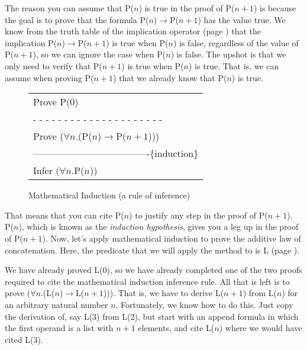 The reason you can assume that P($n$) is true in the proof of P($n+1$)
is because the goal is to prove that the formula
P($n$)$\rightarrow$P($n+1$) has the value true.
We know from the truth table of the implication operator
(page \pageref{implication-truth-table}) that the implication
P($n$)$\rightarrow$P($n+1$) is true when P($n$) is false,
regardless of the value of P($n+1$), so we can ignore the case when P($n$) is false.
The upshot is that we only need to verify that P($n+1$) is true when P($n$) is true.
That is, we can assume when proving P($n+1$) that we already know that P($n$) is true.
\begin{figure}
\begin{center}
\begin{tabular}{l}
Prove P(0) \\
 - - - - - - - - - - - - - - - - - - - - -\\
Prove ($\forall$$n$.(P($n$)$\rightarrow$P($n+1$))) \\
-------------------------------------\{induction\}\\
Infer ($\forall$$n$.P($n$))
\end{tabular}
\end{center}
\caption{Mathematical Induction (a rule of inference)}
\label{fig-04-01}
\label{induction-rule}
\end{figure}

That means that you can cite P($n$) to justify any step in the proof of P($n+1$).
P($n$), which is known as the \emph{induction hypothesis}, gives you a leg up in the proof of P($n+1$).
\label{induction-hyp-def}
Now, let's apply mathematical induction to prove
the additive law of concatenation.
Here, the predicate that we will apply the method to is L (page \pageref{additive-concat-law-predicate}).

\label{len-additive-thm}
We have already proved L(0), so we have already completed one of the
two proofs required to cite the mathematical induction inference rule.
All that is left is to prove ($\forall$$n$.(L($n$)$\rightarrow$L($n+1$))).
That is, we have to derive L($n+1$) from L($n$) for an arbitrary natural number $n$.
Fortunately, we know how to do this. Just copy the derivation of,
say L(3) from L(2), but start with an append formula in which the first operand
is a list with $n+1$ elements, and cite L($n$) where we would have cited L(3).

